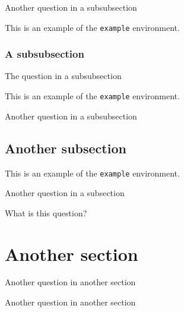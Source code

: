 \documentclass{article}
\newcounter{question}
\newcounter{example}
\begin{document}
    \begin{question}
    Another question in a subsubsection
    \end{question}

    \begin{example}
        This is an example of the \texttt{example} environment.
    \end{example}

    \subsubsection{A subsubsection}

    \begin{question}
    The question in a subsubsection
    \end{question}

    \begin{example}
        This is an example of the \texttt{example} environment.
    \end{example}

    \begin{question}
    Another question in a subsubsection
    \end{question}

    \subsection{Another subsection}

    \begin{example}
        This is an example of the \texttt{example} environment.
    \end{example}

    \begin{question}
    Another question in a subsection
    \end{question}

    \begin{question}
    What is this question?
    \end{question}

    \section{Another section}

    \begin{question}
    Another question in another section
    \end{question}

    \begin{question}
    Another question in another section
    \end{question}
\end{document}
